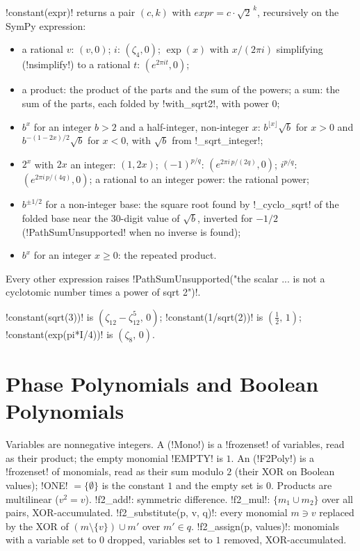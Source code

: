 \begin{definition}\label{def:algebra-constant}
\py!constant(expr)! returns a pair $(c,k)$ with $\mathit{expr}=c\cdot\sqrt2^{\,k}$, recursively on the SymPy expression:
\begin{itemize}
\item a rational $v$: $(v,0)$; $i$: $(\zeta_4,0)$; $\exp(x)$ with $x/(2\pi i)$ simplifying (\py!nsimplify!) to a rational $t$: $(e^{2\pi it},0)$;
\item a product: the product of the parts and the sum of the powers; a sum: the sum of the parts, each folded by \py!with_sqrt2!, with power $0$;
\item $b^x$ for an integer $b>2$ and a half-integer, non-integer $x$: $b^{\lfloor x\rfloor}\sqrt b$ for $x>0$ and $b^{-(1-2x)/2}\sqrt b$ for $x<0$, with $\sqrt b$ from \py!_sqrt_integer!;
\item $2^x$ with $2x$ an integer: $(1,2x)$; $(-1)^{p/q}$: $(e^{2\pi i\,p/(2q)},0)$; $i^{p/q}$: $(e^{2\pi i\,p/(4q)},0)$; a rational to an integer power: the rational power;
\item $b^{\pm1/2}$ for a non-integer base: the square root found by \py!_cyclo_sqrt! of the folded base near the 30-digit value of $\sqrt b$, inverted for $-1/2$ (\py!PathSumUnsupported! when no inverse is found);
\item $b^x$ for an integer $x\ge0$: the repeated product.
\end{itemize}
Every other expression raises \py!PathSumUnsupported("the scalar ... is not a cyclotomic number times a power of sqrt 2")!.
\end{definition}

\begin{example}
\py!constant(sqrt(3))! is $(\zeta_{12}-\zeta_{12}^5,\,0)$; \py!constant(1/sqrt(2))! is $(\tfrac12,\,1)$; \py!constant(exp(pi*I/4))! is $(\zeta_8,\,0)$.
\end{example}

\section{Phase Polynomials and Boolean Polynomials}\label{sec:algebra-pathsum-polys}

\begin{definition}\label{def:algebra-f2}
Variables are nonnegative integers. A  (\py!Mono!) is a \py!frozenset! of variables, read as their product; the empty monomial \py!EMPTY! is $1$. An  (\py!F2Poly!) is a \py!frozenset! of monomials, read as their sum modulo $2$ (their XOR on Boolean values); \py!ONE! $=\{\emptyset\}$ is the constant $1$ and the empty set is $0$. Products are multilinear ($v^2=v$). \py!f2_add!: symmetric difference. \py!f2_mul!: $\{m_1\cup m_2\}$ over all pairs, XOR-accumulated. \py!f2_substitute(p, v, q)!: every monomial $m\ni v$ replaced by the XOR of $(m\setminus\{v\})\cup m'$ over $m'\in q$. \py!f2_assign(p, values)!: monomials with a variable set to $0$ dropped, variables set to $1$ removed, XOR-accumulated.
\end{definition}

